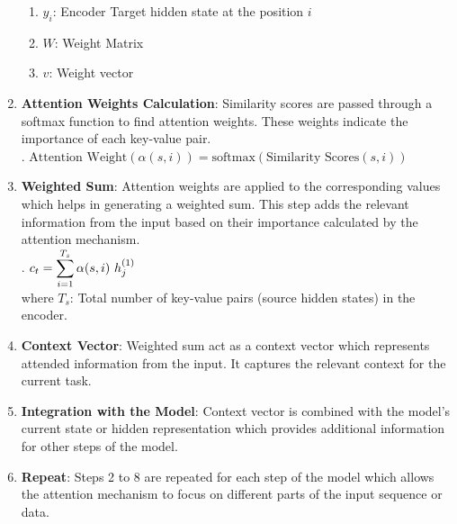 \begin{enumerate}
\begin{enumerate}
        \item $y_i$: Encoder Target hidden state at the position $i$
        \hfill \cite{geeksforgeeks/artificial-intelligence/ml-attention-mechanism/}

        \item $W$: Weight Matrix
        \hfill \cite{geeksforgeeks/artificial-intelligence/ml-attention-mechanism/}

        \item $v$: Weight vector
        \hfill \cite{geeksforgeeks/artificial-intelligence/ml-attention-mechanism/}
    \end{enumerate}
 
    \item \textbf{Attention Weights Calculation}: Similarity scores are passed through a softmax function to find attention weights. 
    These weights indicate the importance of each key-value pair.
    \hfill \cite{geeksforgeeks/artificial-intelligence/ml-attention-mechanism/}
    \\[0.2cm]
    .\hfill
    $\text{Attention Weight}(\alpha(s,i))=\text{softmax}(\text{Similarity Scores}(s,i))$
    \hfill \cite{geeksforgeeks/artificial-intelligence/ml-attention-mechanism/}

    \item \textbf{Weighted Sum}: Attention weights are applied to the corresponding values which helps in generating a weighted sum. 
    This step adds the relevant information from the input based on their importance calculated by the attention mechanism.
    \hfill \cite{geeksforgeeks/artificial-intelligence/ml-attention-mechanism/}
    \\[0.2cm]
    .\hfill
    $ c_t = \dsum^{T_s}_{i=1} \alpha(s,i)\ h_j^{(1)} $
    \hfill \cite{geeksforgeeks/artificial-intelligence/ml-attention-mechanism/}
    \\
    where $T_s$:  Total number of key-value pairs (source hidden states) in the encoder.
    \hfill \cite{geeksforgeeks/artificial-intelligence/ml-attention-mechanism/}

    \item \textbf{Context Vector}: Weighted sum act as a context vector which represents attended information from the input. It captures the relevant context for the current task. 
    \hfill \cite{geeksforgeeks/artificial-intelligence/ml-attention-mechanism/}

    \item \textbf{Integration with the Model}: Context vector is combined with the model's current state or hidden representation which provides additional information for other steps of the model.
    \hfill \cite{geeksforgeeks/artificial-intelligence/ml-attention-mechanism/}

    \item \textbf{Repeat}: Steps 2 to 8 are repeated for each step of the model which allows the attention mechanism to focus on different parts of the input sequence or data.
    \hfill \cite{geeksforgeeks/artificial-intelligence/ml-attention-mechanism/}
\end{enumerate}








